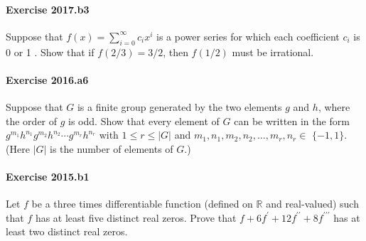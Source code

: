 \documentclass{article}
\begin{document}
\paragraph{Exercise 2017.b3} Suppose that $f(x)=\sum_{i=0}^{\infty} c_{i} x^{i}$ is a power series for which each coefficient $c_{i}$ is 0 or 1 . Show that if $f(2 / 3)=3 / 2$, then $f(1 / 2)$ must be irrational.

\paragraph{Exercise 2016.a6} Suppose that $G$ is a finite group generated by the two elements $g$ and $h$, where the order of $g$ is odd. Show that every element of $G$ can be written in the form $g^{m_1} h^{n_1} g^{m_2} h^{n_2} \cdots g^{m_r} h^{n_r}$ with $1 \leq r \leq|G|$ and $m_1, n_1, m_2, n_2, \ldots, m_r, n_r \in$ $\{-1,1\} .$ (Here $|G|$ is the number of elements of $G$.)

\paragraph{Exercise 2015.b1} Let $f$ be a three times differentiable function (defined on $\mathbb{R}$ and real-valued) such that $f$ has at least five distinct real zeros. Prove that $f+6 f^{\prime}+12 f^{\prime \prime}+8 f^{\prime \prime \prime}$ has at least two distinct real zeros.
\end{document}
